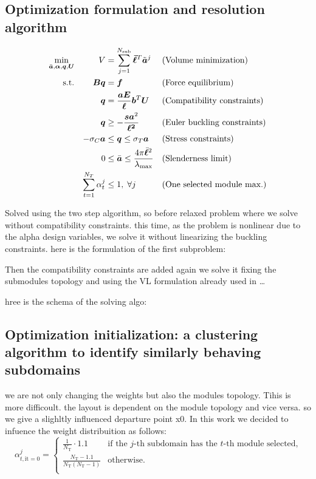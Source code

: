 \subsection{Optimization formulation and resolution algorithm}
\begin{equation}
    \begin{aligned}
    \min_{\bar{\bm{a}}, \bm{\alpha}, \bm{q}, \bm{U}}   && V &= \sum_{j=1}^{N_{\text{sub}}}\bm{\bar{\ell}}^T\tilde{\bm{a}}^j && \textrm{(Volume minimization)}\\
    \textrm{s.t.}   && \bm{B}\bm{q} &= \bm{f} && \textrm{(Force equilibrium)}\\
                    && \bm{q} &= \frac{\bm{a}\bm{E}}{\bm{\ell}}\bm{b}^T\bm{U} && \textrm{(Compatibility constraints)} \\
                    && \bm{q} &\geq -\frac{\bm{s}\bm{a}^2}{\bm{\ell^2}} && \textrm{(Euler buckling constraints)} \\
                    && -\sigma_C\bm{a} &\leq \bm{q} \leq \sigma_T\bm{a} && \textrm{(Stress constraints)} \\
                    && 0 &\leq \bar{\bm{a}} \leq \frac{4 \pi \bar{\bm{\ell}}^2}{\lambda_{\text{max}}} && \textrm{(Slenderness limit)} \\
                    && \sum_{t=1}^{N_T} \alpha_t^j &\leq 1, \; \forall j && \textrm{(One selected module max.)} \\
    \end{aligned}
\end{equation}

Solved using the two step algorithm, so before relaxed problem where we solve without compatibility constraints. this time, as the problem is nonlinear due to the alpha design variables, we solve it without linearizing the buckling constraints.  here is the formulation of the first subproblem:

Then the compatibility constraints are added again
we solve it fixing the submodules topology and using the VL formulation already used in \dots

hree is the schema of the solving algo:


\subsection{Optimization initialization: a clustering algorithm to identify similarly behaving subdomains}
we are not only changing the weights but also the modules topology. Tihis is more difficoult. the layout is dependent on the module topology and vice versa. so we give a slighltly influenced departure point x0. In this work we decided to infuence the weight distribuition as follows:
\begin{equation}
    \alpha_{t,\text{it}=0}^j=
    \begin{cases}
        \frac{1}{N_\text{T}} \cdot 1.1  & \text{if the $j$-th subdomain has the  $t$-th module selected,}\\
        \frac{N_\text{T}-1.1}{N_\text{T}(N_\text{T}-1)} & \text{otherwise.} \\
    \end{cases}  
\end{equation}

